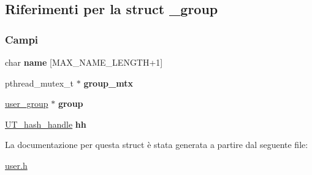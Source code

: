 \hypertarget{struct__group}{}\subsection{Riferimenti per la struct \+\_\+group}
\label{struct__group}
\subsubsection*{Campi}
\begin{DoxyCompactItemize}
\item 
\mbox{\label{struct__group_abdb300ff05595dfe151fd7ca42d11440}} 
char {\bfseries name} \mbox{[}M\+A\+X\+\_\+\+N\+A\+M\+E\+\_\+\+L\+E\+N\+G\+TH+1\mbox{]}
\item 
\mbox{\label{struct__group_a0e4f8afdfdc6c000c764e478c045b940}} 
pthread\+\_\+mutex\+\_\+t $\ast$ {\bfseries group\+\_\+mtx}
\item 
\mbox{\label{struct__group_a7ba4a8ba65542b23370fb3915486bdc2}} 
\mbox{\hyperlink{struct__user__group}{user\+\_\+group}} $\ast$ {\bfseries group}
\item 
\mbox{\label{struct__group_a7222d91206dcd87e5436f7e2be969bf1}} 
\mbox{\hyperlink{structUT__hash__handle}{U\+T\+\_\+hash\+\_\+handle}} {\bfseries hh}
\end{DoxyCompactItemize}


La documentazione per questa struct è stata generata a partire dal seguente file\+:\begin{DoxyCompactItemize}
\item 
\mbox{\hyperlink{user_8h}{user.\+h}}\end{DoxyCompactItemize}
